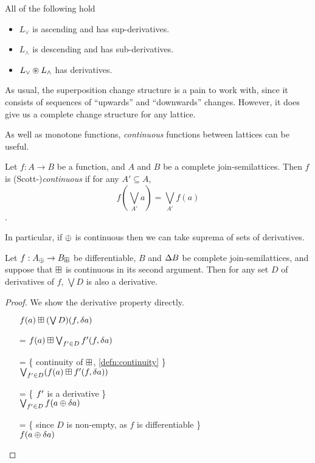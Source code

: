 \begin{prop}
  All of the following hold
  \begin{itemize}
    \item $L_\vee$ is ascending and has sup-derivatives.
    \item $L_\wedge$ is descending and has sub-derivatives.
    \item $L_\vee \circledast L_\wedge$ has derivatives.
  \end{itemize}
\end{prop}

As usual, the superposition change structure is a pain to work with, since it
consists of sequences of ``upwards'' and ``downwards'' changes. However, it does
give us a complete change structure for any lattice.

As well as monotone functions, \emph{continuous} functions between lattices can
be useful.

\begin{defn}
\label{defn:continuity}
  Let $f: A \rightarrow B$ be a function, and $A$ and $B$ be a
  complete join-semilattices. Then $f$ is (Scott-)\textit{continuous} if for any $A' \subseteq A$,
  $$f(\bigvee_{A'} a) = \bigvee_{A'} f(a)$$.
\end{defn}

In particular, if $\oplus$ is continuous then we can take suprema of sets of derivatives.

\begin{prop}
\label{prop:supDerivatives}
  Let $f: A_\oplus \rightarrow B_\boxplus$ be differentiable, $B$ and
  $\Delta B$ be complete join-semilattices, and suppose that $\boxplus$ is continuous
  in its second argument. Then for any set $D$ of derivatives of $f$, $\bigvee
  D$ is also a derivative.
\end{prop}
\begin{proof}
  We show the derivative property directly.
  \begin{itemize}
    \item[ ]$f(a) \boxplus (\bigvee D)(f, \delta a)$
    \item[=]$f(a) \boxplus \bigvee_{f' \in D} f'(f, \delta a)$
    \item[=]\{ continuity of $\boxplus$, \ref{defn:continuity} \}\\
      $\bigvee_{f' \in D} (f(a) \boxplus f'(f, \delta a))$
    \item[=]\{ $f'$ is a derivative \}\\
      $\bigvee_{f' \in D} f(a \oplus \delta a)$
    \item[=]\{ since $D$ is non-empty, as $f$ is differentiable \}\\
      $f(a \oplus \delta a)$
  \end{itemize}
\end{proof}

